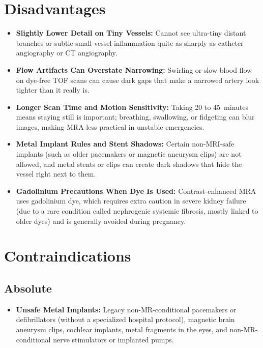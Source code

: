 \section{Disadvantages}
\begin{itemize}
\item \textbf{Slightly Lower Detail on Tiny Vessels:} Cannot see ultra-tiny distant branches or subtle small-vessel inflammation quite as sharply as catheter angiography or CT angiography.
\item \textbf{Flow Artifacts Can Overstate Narrowing:} Swirling or slow blood flow on dye-free TOF scans can cause dark gaps that make a narrowed artery look tighter than it really is.
\item \textbf{Longer Scan Time and Motion Sensitivity:} Taking 20 to 45~minutes means staying still is important; breathing, swallowing, or fidgeting can blur images, making MRA less practical in unstable emergencies.
\item \textbf{Metal Implant Rules and Stent Shadows:} Certain non-MRI-safe implants (such as older pacemakers or magnetic aneurysm clips) are not allowed, and metal stents or clips can create dark shadows that hide the vessel right next to them.
\item \textbf{Gadolinium Precautions When Dye Is Used:} Contrast-enhanced MRA uses gadolinium dye, which requires extra caution in severe kidney failure (due to a rare condition called nephrogenic systemic fibrosis, mostly linked to older dyes) and is generally avoided during pregnancy.
\end{itemize}

\section{Contraindications}

\subsection{Absolute}
\begin{itemize}
\item \textbf{Unsafe Metal Implants:} Legacy non-MR-conditional pacemakers or defibrillators (without a specialized hospital protocol), magnetic brain aneurysm clips, cochlear implants, metal fragments in the eyes, and non-MR-conditional nerve stimulators or implanted pumps.
\end{itemize}

